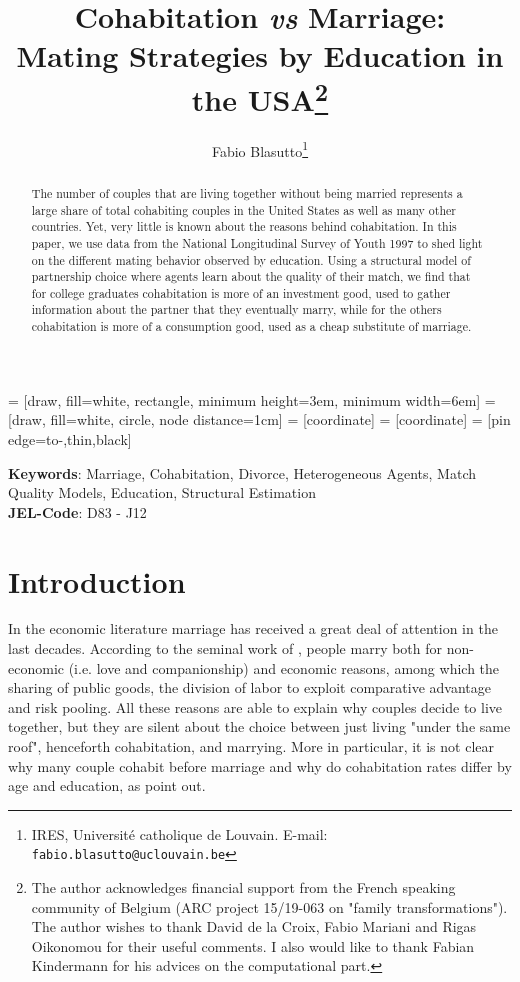 \documentclass[12pt]{article}
\title{Cohabitation \textit{vs} Marriage:\\ Mating Strategies by Education in the USA\thanks{The author acknowledges financial support from the French speaking community of Belgium (ARC project 15/19-063 on "family transformations"). The author wishes to thank David de la Croix, Fabio Mariani and Rigas Oikonomou for their useful comments. I also would like to thank Fabian Kindermann for his advices on the computational part.}}
\author{Fabio Blasutto\thanks{IRES, Université catholique de Louvain. E-mail: \tt{fabio.blasutto@uclouvain.be}}}
\begin{document}
 
 	 = [draw, fill=white, rectangle, 
 	minimum height=3em, minimum width=6em]
 	 = [draw, fill=white, circle, node distance=1cm]
 	 = [coordinate]
 	 = [coordinate]
 	 = [pin edge={to-,thin,black}]
 	



	\maketitle
\begin{abstract}
The number of couples that are living together without being married represents a large share of total cohabiting couples in the United States as well as many other countries. Yet, very little is known about the reasons behind cohabitation. In this paper, we use data from the National Longitudinal Survey of Youth 1997 to shed light on the different mating behavior observed by education. Using a structural model of partnership choice where agents learn about the quality of their match, we find that for college graduates cohabitation is more of an investment good, used to gather information about the partner that they eventually marry, while for the others cohabitation is more of a consumption good, used as a cheap substitute of marriage.
\end{abstract}
\textbf{Keywords}: Marriage, Cohabitation, Divorce, Heterogeneous Agents, Match Quality Models,  Education, Structural Estimation\\
\textbf{JEL-Code}: D83 - J12 
\clearpage
\noindent \medskip{}
\section{Introduction}
In the economic literature marriage has received a great deal of attention in the last decades. According to the seminal work of \citet{becker1981}, people marry both for non-economic (i.e. love and companionship) and economic reasons, among which the sharing of public goods, the division of labor to exploit comparative advantage and risk pooling.
All these reasons are able to explain why couples decide to live together, but they are silent about the choice between just living "under the same roof", henceforth cohabitation, and marrying. More in particular, it is not clear why many couple cohabit before marriage and why do cohabitation rates differ by age and education, as \citet{perelli2016} point out.
\end{document}

